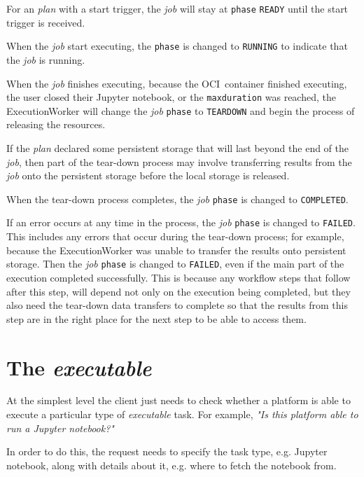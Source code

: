 \documentclass[11pt,a4paper]{ivoa}
\newcommand{\execworker} {ExecutionWorker}
\newcommand{\jupyternotebook} {Jupyter notebook}
\newcommand{\ocicontainer} {OCI~container}
\newcommand{\codeword}[1] {\texttt{#1}}
\newcommand{\executable} {\textit{executable}}
\newcommand{\excutabletask} {\textit{executable} task}
\newcommand{\execplan} {\textit{plan}}
\newcommand{\workerjob} {\textit{job}}
\newcommand{\teardown} {tear-down}
\begin{document}
For an \execplan{} with a start trigger, the \workerjob{} will stay at \codeword{phase}
\codeword{READY} until the start trigger is received.

When the \workerjob{} start executing, the \codeword{phase} is changed to \codeword{RUNNING}
to indicate that the \workerjob{} is running.

When the \workerjob{} finishes executing, because the \ocicontainer{} finished executing,
the user closed their \jupyternotebook, or the \codeword{maxduration} was reached,
the \execworker{} will change the \workerjob{} \codeword{phase} to \codeword{TEARDOWN} and
begin the process of releasing the resources.

If the \execplan{} declared some persistent storage that will last beyond the end of the \workerjob{},
then part of the \teardown{} process may involve transferring results from the \workerjob{}
onto the persistent storage before the local storage is released.

When the \teardown{} process completes, the \workerjob{} \codeword{phase} is changed to \codeword{COMPLETED}.

If an error occurs at any time in the process, the \workerjob{} \codeword{phase} is changed to \codeword{FAILED}.
This includes any errors that occur during the \teardown{} process; for example, because
the \execworker{} was unable to transfer the results onto persistent storage.
Then the \workerjob{} \codeword{phase} is changed to \codeword{FAILED}, even if the main part of the
execution completed successfully.
This is because any workflow steps that follow after this step, will depend not only on the execution being
completed, but they also need the \teardown{} data transfers to complete so that the results from this step
are in the right place for the next step to be able to access them.

\section{The \executable{}}
\label{executable}

At the simplest level the client just needs to check whether a platform is able to execute a particular
type of \excutabletask{}.
For example, \textit{"Is this platform able to run a \jupyternotebook{}?"}

In order to do this, the request needs to specify the task type, e.g. \jupyternotebook{},
along with details about it, e.g. where to fetch the notebook from.
\end{document}
